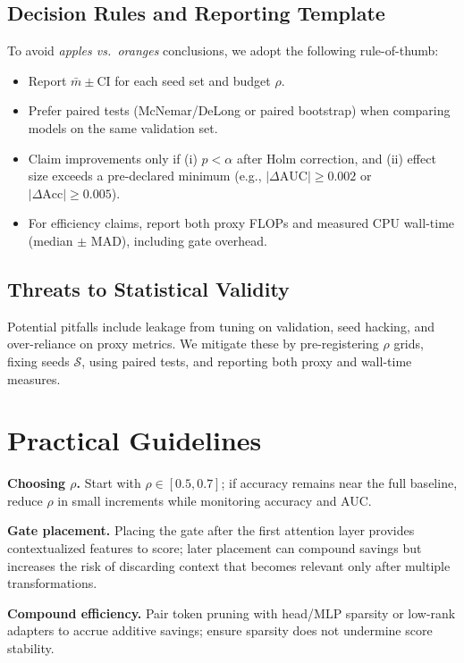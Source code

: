 \documentclass{article}
\begin{document}
\subsection{Decision Rules and Reporting Template}
To avoid \emph{apples vs.\ oranges} conclusions, we adopt the following rule-of-thumb:
\begin{itemize}[leftmargin=1.2em, itemsep=2pt]
\item Report $\bar{m}\pm$CI for each seed set and budget $\rho$.
\item Prefer paired tests (McNemar/DeLong or paired bootstrap) when comparing models on the same validation set.
\item Claim improvements only if (i) $p{<}\alpha$ after Holm correction, and (ii) effect size exceeds a pre-declared minimum (e.g., $|\Delta\text{AUC}| \ge 0.002$ or $|\Delta \text{Acc}| \ge 0.005$).
\item For efficiency claims, report both proxy FLOPs and measured CPU wall-time (median $\pm$ MAD), including gate overhead.
\end{itemize}

\subsection{Threats to Statistical Validity}
Potential pitfalls include leakage from tuning on validation, seed hacking, and over-reliance on proxy metrics. We mitigate these by pre-registering $\rho$ grids, fixing seeds $\mathcal{S}$, using paired tests, and reporting both proxy and wall-time measures.


\section{Practical Guidelines}
\label{sec:guidelines}
\textbf{Choosing $\rho$.} Start with $\rho\in[0.5,0.7]$; if accuracy remains near the full baseline, reduce $\rho$ in small increments while monitoring accuracy and AUC.

\textbf{Gate placement.} Placing the gate after the first attention layer provides contextualized features to score; later placement can compound savings but increases the risk of discarding context that becomes relevant only after multiple transformations.

\textbf{Compound efficiency.} Pair token pruning with head/MLP sparsity or low-rank adapters to accrue additive savings; ensure sparsity does not undermine score stability.
\end{document}
